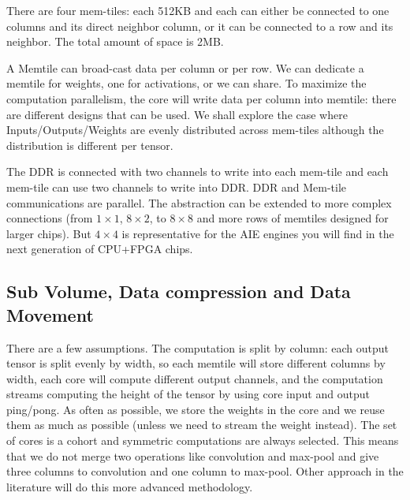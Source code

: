 \documentclass[conference]{IEEEtran}
\begin{document}
There are four mem-tiles: each 512KB and each can either be connected
to one columns and its direct neighbor column, or it can be connected
to a row and its neighbor. The total amount of space is 2MB.

A Memtile can broad-cast data per column or per row. We can dedicate a
memtile for weights, one for activations, or we can share. To maximize
the computation parallelism, the core will write data per column into
memtile: there are different designs that can be used. We shall
explore the case where Inputs/Outputs/Weights are evenly distributed
across mem-tiles although the distribution is different per tensor.

The DDR is connected with two channels to write into each mem-tile and
each mem-tile can use two channels to write into DDR. DDR and Mem-tile
communications are parallel.  The abstraction can be extended to more
complex connections (from $1\times 1$, $8\times 2$, to $8\times 8$ and
more rows of memtiles designed for larger chips). But $4\times 4$ is
representative for the AIE engines you will find in the next
generation of CPU+FPGA chips.


\subsection{Sub Volume, Data compression and Data Movement}
There are a few assumptions. The computation is split by column: each
output tensor is split evenly by width, so each memtile will store
different columns by width, each core will compute different output
channels, and the computation streams computing the height of the
tensor by using core input and output ping/pong. As often as possible,
we store the weights in the core and we reuse them as much as possible
(unless we need to stream the weight instead). The set of cores is a
cohort and symmetric computations are always selected. This means that
we do not merge two operations like convolution and max-pool and give
three columns to convolution and one column to max-pool. Other
approach in the literature will do this more advanced methodology.
\end{document}
